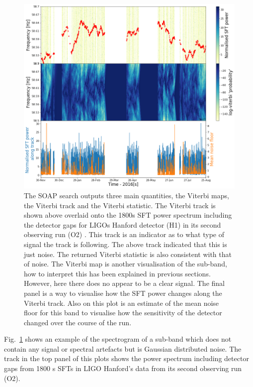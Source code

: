 \begin{figure}
	\centering
	\includegraphics[width=\textwidth]{C5_detchar/track_F58_5_58_7_noise.png}
	\caption[Example SOAP output for Gaussian like noise.]{The SOAP search outputs three main quantities, the Viterbi maps, the Viterbi track and the Viterbi statistic. The Viterbi track is shown above overlaid onto the 1800s \gls{SFT} power spectrum including the detector gaps for \glspl{LIGO} Hanford detector (H1) in its second observing run (O2) \citep{}. This track is an indicator as to what type of signal the track is following. The above track indicated that this is just noise. The returned Viterbi statistic is also consistent with that of noise. The Viterbi map is another visualisation of the sub-band, how to interpret this has been explained in previous sections. However, here there does no appear to be a clear signal. The final panel is a way to visualise how the \gls{SFT} power changes along the Viterbi track. Also on this plot is an estimate of the mean noise floor for this band to visualise how the sensitivity of the detector changed over the course of the run. }
	\label{detchar:soap:noiseplot}
\end{figure}
%
Fig.~\ref{detchar:soap:noiseplot} shows an example of the spectrogram of a sub-band which does not contain any signal or spectral artefacts but is Gaussian distributed noise. 
The track in the top panel of this plots shows the power spectrum including detector gaps from 1800 s \glspl{SFT} in \gls{LIGO} Hanford's data from its second observing run (O2). 
